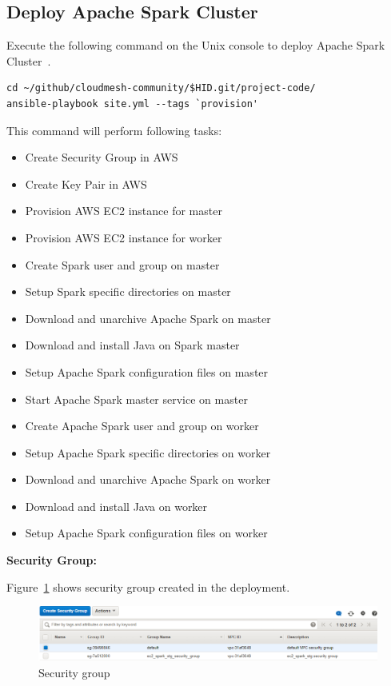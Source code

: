 \subsection{Deploy Apache Spark Cluster}

Execute the following command on the Unix console to deploy Apache
Spark Cluster~\cite{hid-sp18-511-www-spark}.

\begin{verbatim}
cd ~/github/cloudmesh-community/$HID.git/project-code/
ansible-playbook site.yml --tags `provision'
\end{verbatim}

This command will perform following tasks:

\begin{itemize}
	\item Create Security Group in AWS
	\item Create Key Pair in AWS
	\item Provision AWS EC2 instance for master
	\item Provision AWS EC2 instance for worker
	\item Create Spark user and group on master
	\item Setup Spark specific directories on master
	\item Download and unarchive Apache Spark on master
	\item Download and install Java on Spark master
	\item Setup Apache Spark configuration files on master
	\item Start Apache Spark master service on master
	\item Create Apache Spark user and group on worker
	\item Setup Apache Spark specific directories on worker
	\item Download and unarchive Apache Spark on worker
	\item Download and install Java  on worker
	\item Setup Apache Spark configuration files on worker
\end{itemize}

\textbf{Security Group:}

Figure~\ref{f:security-group} shows security group created in the deployment.

\begin{figure}[!ht]
	\centering\includegraphics[width=\columnwidth]{images/securitygroup.png}
	\caption{Security group}\label{f:security-group}
\end{figure}

